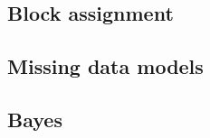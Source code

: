 \documentclass[11pt,english]{article}
\begin{document}
\subsection{Block assignment}

\subsection{Missing data models}

\subsection{Bayes}


\end{document}
